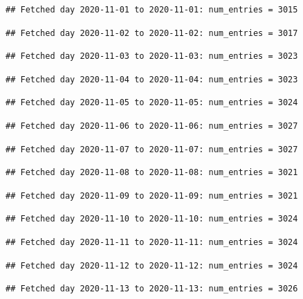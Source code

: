 \documentclass[]{article}
\begin{document}
\begin{verbatim}
## Fetched day 2020-11-01 to 2020-11-01: num_entries = 3015
\end{verbatim}

\begin{verbatim}
## Fetched day 2020-11-02 to 2020-11-02: num_entries = 3017
\end{verbatim}

\begin{verbatim}
## Fetched day 2020-11-03 to 2020-11-03: num_entries = 3023
\end{verbatim}

\begin{verbatim}
## Fetched day 2020-11-04 to 2020-11-04: num_entries = 3023
\end{verbatim}

\begin{verbatim}
## Fetched day 2020-11-05 to 2020-11-05: num_entries = 3024
\end{verbatim}

\begin{verbatim}
## Fetched day 2020-11-06 to 2020-11-06: num_entries = 3027
\end{verbatim}

\begin{verbatim}
## Fetched day 2020-11-07 to 2020-11-07: num_entries = 3027
\end{verbatim}

\begin{verbatim}
## Fetched day 2020-11-08 to 2020-11-08: num_entries = 3021
\end{verbatim}

\begin{verbatim}
## Fetched day 2020-11-09 to 2020-11-09: num_entries = 3021
\end{verbatim}

\begin{verbatim}
## Fetched day 2020-11-10 to 2020-11-10: num_entries = 3024
\end{verbatim}

\begin{verbatim}
## Fetched day 2020-11-11 to 2020-11-11: num_entries = 3024
\end{verbatim}

\begin{verbatim}
## Fetched day 2020-11-12 to 2020-11-12: num_entries = 3024
\end{verbatim}

\begin{verbatim}
## Fetched day 2020-11-13 to 2020-11-13: num_entries = 3026
\end{verbatim}
\end{document}

